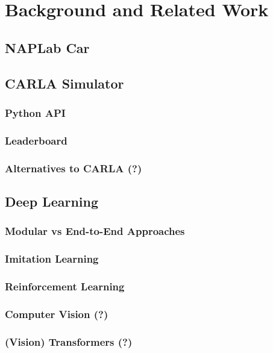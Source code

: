 \chapter{Background and Related Work}
\label{chap:background}

\section{NAPLab Car}


\section{CARLA Simulator}

\subsection{Python API}

\subsection{Leaderboard}

\subsection{Alternatives to CARLA (?)}


\section{Deep Learning}

\subsection{Modular vs End-to-End Approaches}

\subsection{Imitation Learning}

\subsection{Reinforcement Learning}

\subsection{Computer Vision (?)}

\subsection{(Vision) Transformers (?)}


